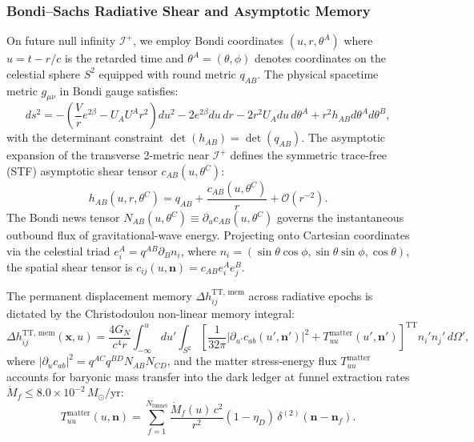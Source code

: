 \documentclass[11pt,onecolumn]{article}
\begin{document}
\subsubsection{Bondi--Sachs Radiative Shear and Asymptotic Memory}
On future null infinity $\mathscr{I}^+$, we employ Bondi coordinates $(u, r, \theta^A)$ where $u = t - r/c$ is the retarded time and $\theta^A = (\theta, \phi)$ denotes coordinates on the celestial sphere $S^2$ equipped with round metric $q_{AB}$. The physical spacetime metric $g_{\mu\nu}$ in Bondi gauge satisfies:
\begin{equation}
    ds^2 = -\left( \frac{V}{r} e^{2\beta} - U_A U^A r^2 \right) du^2 - 2 e^{2\beta} du\,dr - 2 r^2 U_A du\,d\theta^A + r^2 h_{AB} d\theta^A d\theta^B,
    \label{eq:bondi_metric_spec}
\end{equation}
with the determinant constraint $\det(h_{AB}) = \det(q_{AB})$. The asymptotic expansion of the transverse 2-metric near $\mathscr{I}^+$ defines the symmetric trace-free (STF) asymptotic shear tensor $c_{AB}(u, \theta^C)$:
\begin{equation}
    h_{AB}(u, r, \theta^C) = q_{AB} + \frac{c_{AB}(u, \theta^C)}{r} + \mathcal{O}(r^{-2}).
\end{equation}
The Bondi news tensor $N_{AB}(u, \theta^C) \equiv \partial_u c_{AB}(u, \theta^C)$ governs the instantaneous outbound flux of gravitational-wave energy. Projecting onto Cartesian coordinates via the celestial triad $e_i^A = q^{AB}\partial_B n_i$, where $n_i = (\sin\theta\cos\phi, \sin\theta\sin\phi, \cos\theta)$, the spatial shear tensor is $c_{ij}(u, \mathbf{n}) = c_{AB} e_i^A e_j^B$.

The permanent displacement memory $\Delta h_{ij}^{\text{TT, mem}}$ across radiative epochs is dictated by the Christodoulou non-linear memory integral:
\begin{equation}
    \Delta h_{ij}^{\text{TT, mem}}(\mathbf{x}, u) = \frac{4 G_N}{c^4 r} \int_{-\infty}^{u} du' \int_{S^2} \left[ \frac{1}{32\pi} |\partial_{u'} c_{ab}(u', \mathbf{n}')|^2 + T_{uu}^{\text{matter}}(u', \mathbf{n}') \right]^{\text{TT}} n_i' n_j'\,d\Omega',
    \label{eq:christodoulou_memory_integral}
\end{equation}
where $|\partial_u c_{ab}|^2 = q^{AC}q^{BD}N_{AB}N_{CD}$, and the matter stress-energy flux $T_{uu}^{\text{matter}}$ accounts for baryonic mass transfer into the dark ledger at funnel extraction rates $\dot{M}_f \le 8.0 \times 10^{-2}\,M_\odot/\text{yr}$:
\begin{equation}
    T_{uu}^{\text{matter}}(u, \mathbf{n}) = \sum_{f=1}^{N_{\text{funnel}}} \frac{\dot{M}_f(u)\,c^2}{r^2} (1 - \eta_D)\,\delta^{(2)}(\mathbf{n} - \mathbf{n}_f).
\end{equation}
\end{document}
